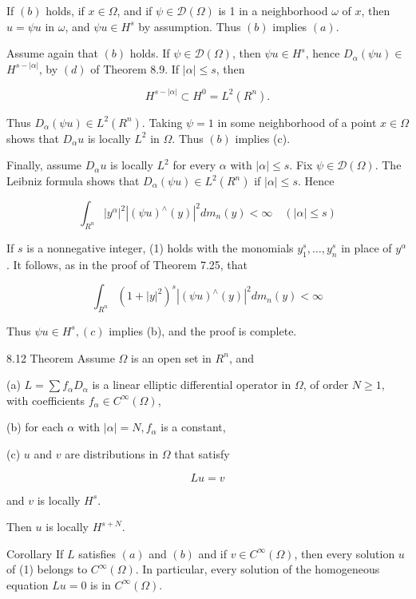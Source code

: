 \documentclass[10pt]{article}
\begin{document}
If $(b)$ holds, if $x \in \Omega$, and if $\psi \in \mathscr{D}(\Omega)$ is 1 in a neighborhood $\omega$ of $x$, then $u=\psi u$ in $\omega$, and $\psi u \in H^{s}$ by assumption. Thus $(b)$ implies $(a)$.

Assume again that $(b)$ holds. If $\psi \in \mathscr{D}(\Omega)$, then $\psi u \in H^{s}$, hence $D_{\alpha}(\psi u) \in$ $H^{s-|\alpha|}$, by $(d)$ of Theorem 8.9. If $|\alpha| \leq s$, then

$$
H^{s-|\alpha|} \subset H^{0}=L^{2}\left(R^{n}\right) .
$$

Thus $D_{\alpha}(\psi u) \in L^{2}\left(R^{n}\right)$. Taking $\psi=1$ in some neighborhood of a point $x \in \Omega$ shows that $D_{\alpha} u$ is locally $L^{2}$ in $\Omega$. Thus $(b)$ implies (c).

Finally, assume $D_{\alpha} u$ is locally $L^{2}$ for every $\alpha$ with $|\alpha| \leq s$. Fix $\psi \in \mathscr{D}(\Omega)$. The Leibniz formula shows that $D_{\alpha}(\psi u) \in L^{2}\left(R^{n}\right)$ if $|\alpha| \leq s$. Hence

$$
\int_{R^{n}}\left|y^{\alpha}\right|^{2}\left|(\psi u)^{\wedge}(y)\right|^{2} d m_{n}(y)<\infty \quad(|\alpha| \leq s)
$$

If $s$ is a nonnegative integer, (1) holds with the monomials $y_{1}^{s}, \ldots, y_{n}^{s}$ in place of $y^{\alpha}$. It follows, as in the proof of Theorem 7.25, that

$$
\int_{R^{n}}\left(1+|y|^{2}\right)^{s}\left|(\psi u)^{\wedge}(y)\right|^{2} d m_{n}(y)<\infty
$$

Thus $\psi u \in H^{s},(c)$ implies (b), and the proof is complete.

8.12 Theorem Assume $\Omega$ is an open set in $R^{n}$, and

(a) $L=\sum f_{\alpha} D_{\alpha}$ is a linear elliptic differential operator in $\Omega$, of order $N \geq 1$, with coefficients $f_{\alpha} \in C^{\infty}(\Omega)$,

(b) for each $\alpha$ with $|\alpha|=N, f_{\alpha}$ is a constant,

(c) $u$ and $v$ are distributions in $\Omega$ that satisfy

$$
L u=v
$$

and $v$ is locally $H^{s}$.

Then $u$ is locally $H^{s+N}$.

Corollary If $L$ satisfies $(a)$ and $(b)$ and if $v \in C^{\infty}(\Omega)$, then every solution $u$ of (1) belongs to $C^{\infty}(\Omega)$. In particular, every solution of the homogeneous equation $L u=0$ is in $C^{\infty}(\Omega)$.
\end{document}
